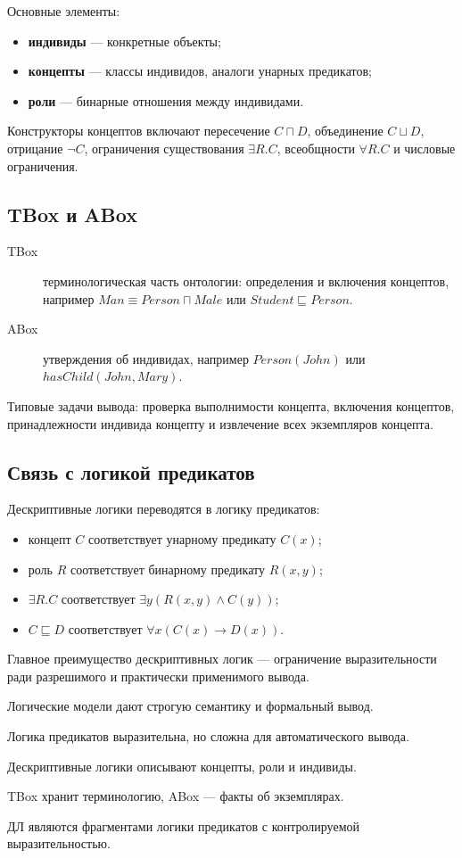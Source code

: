 Основные элементы:
\begin{itemize}
    \item \textbf{индивиды} --- конкретные объекты;
    \item \textbf{концепты} --- классы индивидов, аналоги унарных предикатов;
    \item \textbf{роли} --- бинарные отношения между индивидами.
\end{itemize}

Конструкторы концептов включают пересечение $C\sqcap D$, объединение $C\sqcup D$, отрицание $\neg C$, ограничения существования $\exists R.C$, всеобщности $\forall R.C$ и числовые ограничения.

\subsection*{TBox и ABox}

\begin{description}
    \item[TBox] терминологическая часть онтологии: определения и включения концептов, например $Man \equiv Person\sqcap Male$ или $Student\sqsubseteq Person$.
    \item[ABox] утверждения об индивидах, например $Person(John)$ или $hasChild(John,Mary)$.
\end{description}

Типовые задачи вывода: проверка выполнимости концепта, включения концептов, принадлежности индивида концепту и извлечение всех экземпляров концепта.

\subsection*{Связь с логикой предикатов}

Дескриптивные логики переводятся в логику предикатов:
\begin{itemize}
    \item концепт $C$ соответствует унарному предикату $C(x)$;
    \item роль $R$ соответствует бинарному предикату $R(x,y)$;
    \item $\exists R.C$ соответствует $\exists y(R(x,y)\land C(y))$;
    \item $C\sqsubseteq D$ соответствует $\forall x(C(x)\to D(x))$.
\end{itemize}

Главное преимущество дескриптивных логик --- ограничение выразительности ради разрешимого и практически применимого вывода.

\begin{important}
    \item Логические модели дают строгую семантику и формальный вывод.
    \item Логика предикатов выразительна, но сложна для автоматического вывода.
    \item Дескриптивные логики описывают концепты, роли и индивиды.
    \item TBox хранит терминологию, ABox --- факты об экземплярах.
    \item ДЛ являются фрагментами логики предикатов с контролируемой выразительностью.
\end{important}

